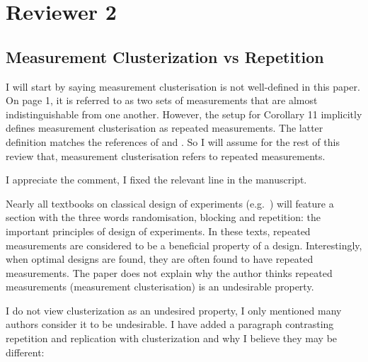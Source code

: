 \section{Reviewer 2}\label{ref2}
\subsection{Measurement Clusterization vs Repetition}
\RC I will start by saying measurement clusterisation is not
well-defined in this paper. On page 1, it is referred to as two sets
of measurements that are almost indistinguishable from one
another. However, the setup for Corollary 11 implicitly defines
measurement clusterisation as repeated measurements. The latter
definition matches the references of \cite{fedorov1996} and
\cite{nyberg2012}. So I will assume for the rest of this review that,
measurement clusterisation refers to repeated measurements.

\AR I appreciate the comment, I fixed the relevant line in the
manuscript.


\RC Nearly all textbooks on classical design of experiments
(e.g.~\cite[Section 1.2.4]{morris2011}) will feature a section with
the three words randomisation, blocking and repetition: the important
principles of design of experiments.  In these texts, repeated
measurements are considered to be a beneficial property of a
design. Interestingly, when optimal designs are found, they are often
found to have repeated measurements. The paper does not explain why
the author thinks repeated measurements (measurement clusterisation)
is an undesirable property.

\AR\label{rep} I do not view clusterization as an undesired property, I only
mentioned many authors consider it to be undesirable. I have added a
paragraph contrasting repetition and replication with clusterization
and why I believe they may be different:


